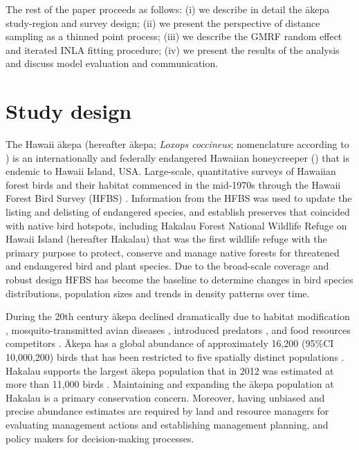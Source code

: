 \documentclass[preprint,12pt]{elsarticle}
\newcommand{\akepa}{\textquotesingle\={a}kepa}  %
\newcommand{\Akepa}{\textquotesingle\={A}kepa}  %
\newcommand{\hawaii}{Hawai\textquotesingle i}   %
\begin{document}
The rest of the paper proceeds as follows:  (i) we describe in detail the \akepa{} study-region and survey design; (ii) we present the perspective of distance sampling as a thinned point process; (iii) we describe the GMRF random effect and iterated INLA fitting procedure; (iv) we present the results of the analysis and discuss model evaluation and communication.

\section{Study design}

The \hawaii{} \akepa{} (hereafter \akepa{}; \textit{Loxops coccineus}; nomenclature according to \citealp{usfws_akepa_1970}) is an internationally and federally endangered Hawaiian honeycreeper (\citealp{usfws_akepa_1970, birdlife_akepa_2016}) that is endemic to \hawaii{} Island, USA.  Large-scale, quantitative surveys of Hawaiian forest birds and their habitat commenced in the mid-1970s through the Hawaii Forest Bird Survey (HFBS) \citep{scott_HFBS_1986}. Information from the HFBS was used to update the listing and delisting of endangered species, and establish preserves that coincided with native bird hotspots, including Hakalau Forest National Wildlife Refuge on \hawaii{} Island (hereafter Hakalau) that was the first wildlife refuge with the primary purpose to protect, conserve and manage native forests for threatened and endangered bird and plant species. Due to the broad-scale coverage and robust design HFBS has become the baseline to determine changes in bird species distributions, population sizes and trends in density patterns over time.

During the 20th century \akepa{} declined dramatically due to habitat modification \citep{scott_HFBS_1986, pratt_avifaunal_1994},  mosquito-transmitted avian diseases \citep{pratt_avifaunal_1994, atkinson_wildlife_1995}, introduced predators \citep{lepson_akepa_1997}, and food resources competitors \citep{lepson_akepa_1997}. \Akepa{} has a global abundance of approximately 16,200 (95\%CI 10,000,200) birds that has been restricted to five spatially distinct populations \citep{judge_akepa_2018}. Hakalau supports the largest \akepa{} population that in 2012 was estimated at more than 11,000 birds \citep{camp_statespace_2016}. Maintaining and expanding the \akepa{} population at Hakalau is a primary conservation concern. Moreover, having unbiased and precise abundance estimates are required by land and resource managers for evaluating management actions and establishing management planning, and policy makers for decision-making processes.
\end{document}
